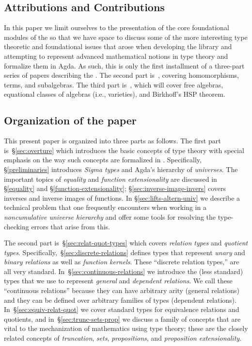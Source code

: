 \subsection{Attributions and Contributions}\label{sec:contributions}


In this paper we limit ourselves to the presentation of the core foundational modules of the \ualib so that we have space to discuss some of the more interesting type theoretic and foundational issues that arose when developing the library and attempting to represent advanced mathematical notions in type theory and formalize them in Agda.  As such, this is only the first installment of a three-part series of papers describing the \agdaualib. The second part is~\cite{DeMeo:2021-2}, covering homomorphisms, terms, and subalgebras. The third part is~\cite{DeMeo:2021-3}, which will cover free algebras, equational classes of algebras (i.e., varieties), and Birkhoff's HSP theorem.

\subsection{Organization of the paper}\label{sec:organization}

This present paper is organized into three parts as follows. The first part is~\S\ref{sec:overture} which introduces the basic concepts of type theory with special emphasis on the way such concepts are formalized in \agda. Specifically, \S\ref{preliminaries} introduces \emph{Sigma types} and Agda's hierarchy of \emph{universes}. The important topics of \emph{equality} and \emph{function extensionality} are discussed in \S\ref{equality} and \S\ref{function-extensionality}; \S\ref{sec:inverse-image-invers} covers inverses and inverse images of functions. In \S\ref{sec:lifts-altern-univ} we describe a technical problem that one frequently encounters when working in a \emph{noncumulative universe hierarchy} and offer some tools for resolving the type-checking errors that arise from this.

The second part is~\S\ref{sec:relat-quot-types} which covers \emph{relation types} and \emph{quotient types}. Specifically,~\S\ref{sec:discrete-relations} defines types that represent \emph{unary} and \emph{binary relations} as well as \emph{function kernels}. These ``discrete relation types,'' are all very standard.  In~\S\ref{sec:continuous-relations} we introduce the (less standard) types that we use to represent \emph{general} and \emph{dependent relations}. We call these ``continuous relations'' because they can have arbitrary arity (general relations) and they can be defined over arbitrary families of types (dependent relations).
In~\S\ref{sec:equiv-relat-quot} we cover standard types for equivalence relations and quotients, and in~\S\ref{sec:trunc-sets-prop} we discuss a family of concepts that are vital to the mechanization of mathematics using type theory; these are the closely related concepts of \emph{truncation}, \emph{sets}, \emph{propositions}, and \emph{proposition extensionality}.

